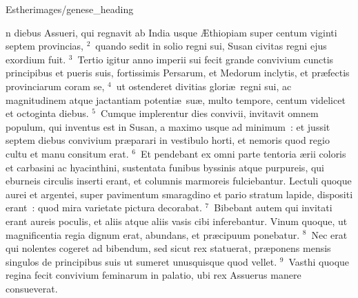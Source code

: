 {Esther}{images/genese_heading}


\bchapter
{}n diebus Assueri, qui regnavit ab India usque \AE thiopiam super centum viginti septem provincias,
${}^{2}$~quando sedit in solio regni sui, Susan civitas regni ejus exordium fuit.
${}^{3}$~Tertio igitur anno imperii sui fecit grande convivium cunctis principibus et pueris suis, fortissimis Persarum, et Medorum inclytis, et pr\ae fectis provinciarum coram se,
${}^{4}$~ut ostenderet divitias glori\ae\ regni sui, ac magnitudinem atque jactantiam potenti\ae\ su\ae , multo tempore, centum videlicet et octoginta diebus.
${}^{5}$~Cumque implerentur dies convivii, invitavit omnem populum, qui inventus est in Susan, a maximo usque ad minimum~: et jussit septem diebus convivium pr\ae parari in vestibulo horti, et nemoris quod regio cultu et manu consitum erat.
${}^{6}$~Et pendebant ex omni parte tentoria \ae rii coloris et carbasini ac hyacinthini, sustentata funibus byssinis atque purpureis, qui eburneis circulis inserti erant, et columnis marmoreis fulciebantur. Lectuli quoque aurei et argentei, super pavimentum smaragdino et pario stratum lapide, dispositi erant~: quod mira varietate pictura decorabat.
${}^{7}$~Bibebant autem qui invitati erant aureis poculis, et aliis atque aliis vasis cibi inferebantur. Vinum quoque, ut magnificentia regia dignum erat, abundans, et pr\ae cipuum ponebatur.
${}^{8}$~Nec erat qui nolentes cogeret ad bibendum, sed sicut rex statuerat, pr\ae ponens mensis singulos de principibus suis ut sumeret unusquisque quod vellet.
${}^{9}$~Vasthi quoque regina fecit convivium feminarum in palatio, ubi rex Assuerus manere consueverat.


